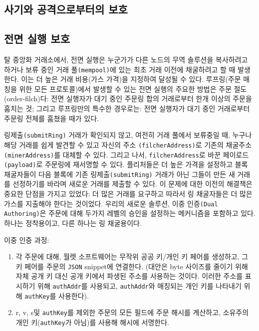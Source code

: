 \documentclass{article}
\begin{document}
\begin{multicols}{2}
\section{사기와 공격으로부터의 보호}

\subsection{전면 실행 보호\label{sec:dual_authoring}}
탈 중앙화 거래소에서, 전면 실행은 누군가가 다른 노드의 무역 솔루션을 복사하려고 하거나 보류 중인 거래 풀\verb|(mempool)|에 있는 최초 거래 이전에 채굴하려고 할 때 발생한다. 이는 더 높은 거래 비용(가스 가격)을 지정하여 달성될 수 있다. 루프링(주문 매칭을 위한 모든 프로토콜)에서 발생할 수 있는 전면 실행의 주요한 방법은 주문 절도(order-filch)다: 전면 실행자가 대기 중인 주문링 합의 거래로부터 한개 이상의 주문을 훔치는 것; 그리고 루프링만의 특수한 경우로는: 전면 실행자가 대기 중인 거래로부터 주문링 전체를 훔쳤을 때가 있다.

링제출\verb|(submitRing)| 거래가 확인되지 않고, 여전히 거래 풀에서 보류중일 때, 누구나 해당 거래를 쉽게 발견할 수 있고 자신의 주소 \verb|(filcherAddress)|로 기존의 채굴주소\verb|(minerAddress)|를 대체할 수 있다. 그리고 나서, \verb|filcherAddress|로 바꾼 페이로드\verb|(payload)|로 주문링에 재서명할 수 있다. 플리처들은 더 높은 가격을 설정하고 블록 채굴자들이 다음 블록에 기존 링제출\verb|(submitRing)| 거래가 아닌 그들이 만든 새 거래를 선정하기를 바라며 새로운 거래를 제출할 수 있다.
이 문제에 대한 이전의 해결책은 중요한 단점을 가지고 있었다: 더 많은 거래를 요구하고 따라서 링 채굴자들은 더 많은 가스를 지출해야 한다는 것이었다. 우리의 새로운 솔루션, 이중 인증\verb|(Dual Authoring)|\cite{dualauthor}은 주문에 대해 두가지 레벨의 승인을 설정하는 메커니즘을 포함하고 있다. 하나는 정착용이고, 다른 하나는 링 채굴용이다.

이중 인증 과정:

\begin{enumerate}

      \item 각 주문에 대해, 월렛 소프트웨어는 무작위 공공 키/개인 키 페어를 생성하고, 그 키 페어를 주문의 \verb|JSON| snippet에 연결한다. (대안은 byte 사이즈를 줄이기 위해 자체 공개 키 대신 공개 키에서 파생된 주소를 사용하는 것이다. 이러한 주소를 표시하기 위해 \verb|authAddr|를 사용되고, \verb|authAddr|와 매칭되는 개인 키를 나타내기 위해 \verb|authKey|를 사용한다).
     
      \item r, v, s및 \verb|authKey|를 제외한 주문의 모든 필드에 주문 해시를 계산하고, 소유주의 개인 키(\verb|authKey|가 아님)를 사용해 해시에 서명한다. 
      

\end{enumerate}
\end{multicols}
\end{document}
